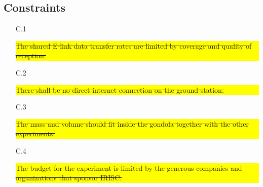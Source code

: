 \subsection{Constraints}

\begin{enumerate}[topsep=0pt,itemsep=-1ex,partopsep=1ex,parsep=1ex]
    \item[C.1] \colorbox{yellow}{\parbox{\textwidth}{\st{The shared E-link data transfer rates are limited by coverage and quality of reception.}}}
    \item[C.2] \colorbox{yellow}{\parbox{\textwidth}{\st{There shall be no direct internet connection on the ground station.}}}
    \item[C.3] \colorbox{yellow}{\parbox{\textwidth}{\st{The mass and volume should fit inside the gondola together with the other experiments.}}}
    \item[C.4] \colorbox{yellow}{\parbox{\textwidth}{\st{The budget for the experiment is limited by the generous companies and organizations that sponsor IRISC.}}}
\end{enumerate}